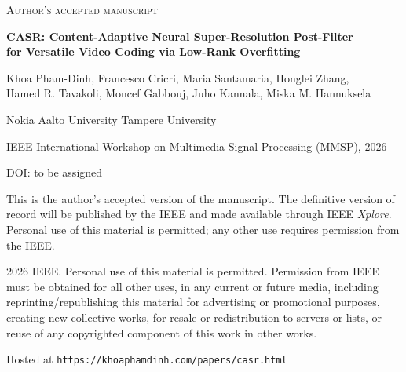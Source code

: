 \documentclass[11pt]{article}
\begin{document}
\begin{center}
{\footnotesize\scshape Author's accepted manuscript}

\vspace{1.6em}

{\large\bfseries CASR: Content-Adaptive Neural Super-Resolution Post-Filter\\[0.25em]
for Versatile Video Coding via Low-Rank Overfitting\par}

\vspace{1.2em}

{\normalsize Khoa Pham-Dinh, Francesco Cricri, Maria Santamaria, Honglei Zhang,\\[0.15em]
Hamed R. Tavakoli, Moncef Gabbouj, Juho Kannala, Miska M. Hannuksela\par}

\vspace{0.9em}

{\small Nokia \quad\textbullet\quad Aalto University \quad\textbullet\quad Tampere University\par}

\vspace{1.6em}

{\small IEEE International Workshop on Multimedia Signal Processing (MMSP), 2026\par}

\vspace{0.4em}

{\small DOI: to be assigned\par}
\end{center}

\vfill

{\small
This is the author's accepted version of the manuscript. The definitive version of record
will be published by the IEEE and made available through IEEE \textit{Xplore}. Personal use
of this material is permitted; any other use requires permission from the IEEE.

\vspace{1.2em}

\textcopyright{} 2026 IEEE. Personal use of this material is permitted. Permission from IEEE
must be obtained for all other uses, in any current or future media, including
reprinting/republishing this material for advertising or promotional purposes, creating new
collective works, for resale or redistribution to servers or lists, or reuse of any
copyrighted component of this work in other works.
\par}

\vspace{2em}

{\footnotesize Hosted at \texttt{https://khoaphamdinh.com/papers/casr.html}\par}
\end{document}
